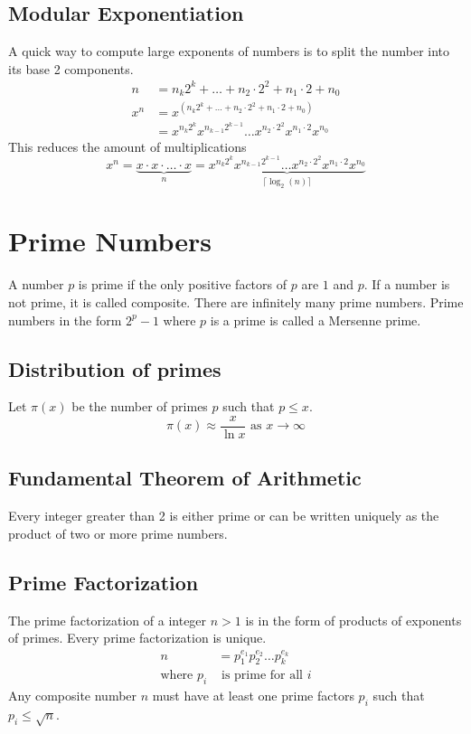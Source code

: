 \documentclass{article}
\theoremstyle{mytheoremstyle}
\theoremstyle{mytheoremstyle}
\theoremstyle{myproblemstyle}
\begin{document}
    \subsection*{Modular Exponentiation}
    A quick way to compute large exponents of numbers is to split the number
    into its base 2 components.
    \begin{align*}
        n &= n_k2^k + \dots + n_2\cdot 2^2+n_1\cdot 2 + n_0 \\
        x^n &= x^{(n_k2^k + \dots + n_2\cdot 2^2+n_1\cdot 2 + n_0)} \\
            &= x^{n_k2^k}x^{n_{k-1}2^{k-1}}\dots x^{n_2\cdot 2^2} x^{n_1\cdot 2} x^{n_0}
    \end{align*}
    This reduces the amount of multiplications
    \[
        x^n = \underbrace{x\cdot x\cdot \dots \cdot x}_n
        = \underbrace{x^{n_k2^k}x^{n_{k-1}2^{k-1}}\dots x^{n_2\cdot 2^2} x^{n_1\cdot 2} x^{n_0}}_{\lceil\log_2(n)\rceil}
    \]

    \section*{Prime Numbers}
    A number $p$ is prime if the only positive factors of $p$ are $1$ and $p$.
    If a number is not prime, it is called composite. There are infinitely many
    prime numbers. Prime numbers in the form $2^p-1$ where $p$ is a prime is
    called a Mersenne prime.

    \subsection*{Distribution of primes}
    Let $\pi(x)$ be the number of primes $p$ such that $p \le x$.
    \[
        \pi(x) \approx \frac{x}{\ln x} \text{ as } x \rightarrow \infty
    \]

    \subsection*{Fundamental Theorem of Arithmetic}
    Every integer greater than 2 is either prime or can be written uniquely as the product
    of two or more prime numbers.

    \subsection*{Prime Factorization}
    The prime factorization of a integer $n>1$ is in the form of products of
    exponents of primes. Every prime factorization is unique.
    \begin{align*}
        n &= p_1^{e_1}p_2^{e_2}\dots p_k^{e_k} \\
        \text{where } p_i &\text{ is prime for all } i
    \end{align*}
    Any composite number $n$ must have at least one prime factors $p_i$ such
    that  $p_i\le\sqrt{n}$.
\end{document}
